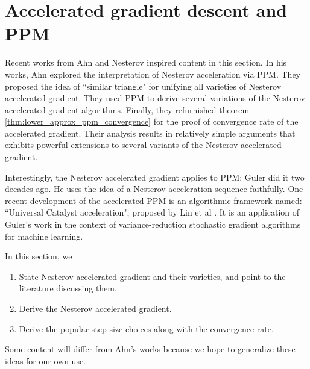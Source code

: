 \documentclass[12pt]{article}
\begin{document}
        
\section{Accelerated gradient descent and PPM}
    Recent works from Ahn \cite{ahn_understanding_2022} and Nesterov \cite{nesterov_lectures_2018} inspired content in this section.
    In his works, Ahn explored the interpretation of Nesterov acceleration via PPM. 
    They proposed the idea of ``similar triangle" for unifying all varieties of Nesterov accelerated gradient. 
    They used PPM to derive several variations of the Nesterov accelerated gradient algorithms. 
    Finally, they refurnished \hyperref[thm:lower_approx_ppm_convergence]{theorem \ref*{thm:lower_approx_ppm_convergence}} for the proof of convergence rate of the accelerated gradient.
    Their analysis results in relatively simple arguments that exhibits powerful extensions to several variants of the Nesterov accelerated gradient. 
    \par\noindent
    Interestingly, the Nesterov accelerated gradient applies to PPM; Guler \cite{guler_new_1992} did it two decades ago. 
    He uses the idea of a Nesterov acceleration sequence faithfully. 
    One recent development of the accelerated PPM is an algorithmic framework named: ``Universal Catalyst acceleration", proposed by Lin et al \cite{lin_universal_2015}. 
    It is an application of Guler's work in the context of variance-reduction stochastic gradient algorithms for machine learning. 
    \par\noindent
    In this section, we
    \begin{enumerate}
        \item State Nesterov accelerated gradient and their varieties, and point to the literature discussing them. 
        \item Derive the Nesterov accelerated gradient. 
        \item Derive the popular step size choices along with the convergence rate. 
    \end{enumerate}
    Some content will differ from Ahn's works because we hope to generalize these ideas for our own use. 
    
    
\end{document}
